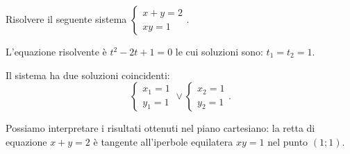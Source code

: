 \begin{esempio}
Risolvere il seguente sistema 
\(\left\{\begin{array}{l}{x+y=2}\\{xy=1}\end{array}\right.\).
\begin{multicols}{2}
L'equazione risolvente è \(t^2-2t+1=0\) le cui soluzioni sono: \(t_1=t_2=1\).

Il sistema ha due soluzioni coincidenti: \[ 
\left\{\begin{array}{l}{x_1=1}\\{y_1=1}\end{array}\right.\vee 
\left\{\begin{array}{l}{x_2=1}\\{y_2=1}\end{array}\right.. \]

Possiamo interpretare i risultati ottenuti nel piano cartesiano: la retta di 
equazione \(x+y=2\) è tangente all'iperbole equilatera \(xy=1\) nel punto \((1;1)\).
\begin{center}

\end{center}
\end{multicols}
\end{esempio}
% 
% 
% 
% 
